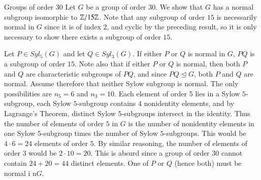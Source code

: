 \documentclass[12pt, a4paper, twoside, openright, titlepage]{book}
\begin{document}
\begin{eg}{Groups of order $30$}{}
    Let $G$ be a group of order $30$. We show that $G$ has a normal subgroup isomorphic to $\mathbb Z/15\mathbb Z$. Note that any subgroup of order $15$ is necessarily normal in $G$ since it is of index $2$, and cyclic by the preceding result, so it is only necessary to show there exists a subgroup of order $15$. 

    Let $P \in Syl_5(G)$ and let $Q \in Syl_3(G)$. If either $P$ or $Q$ is normal in $G$, $PQ$ is a subgroup of order $15$. Note also that if either $P$ or $Q$ is normal, then both $P$ and $Q$ are characteristic subgroups of $PQ$, and since $PQ \trianglelefteq G$, both $P$ and $Q$ are normal. Assume therefore that neither Sylow subgroup is normal. The only possibilities are $n_5 = 6$ and $n_3 = 10$. Each element of order $5$ lies in a Sylow $5$-subgroup, each Sylow $5$-subgroup contains $4$ nonidentity elements, and by Lagrange's Theorem, distinct Sylow $5$-subgroups intersect in the identity. Thus the number of elements of order $5$ in $G$ is the number of nonidentity elements in one Sylow $5$-subgroup times the number of Sylow $5$-subgroups. This would be $4\cdot 6 = 24$ elements of order $5$. By similar reasoning, the number of elements of order $3$ would be $2 \cdot 10 = 20$. This is absurd since a group of order $30$ cannot contain $24+20 = 44$ distinct elements. One of $P$ or $Q$ (hence both) must be normal i n$G$.
\end{eg}
\end{document}
